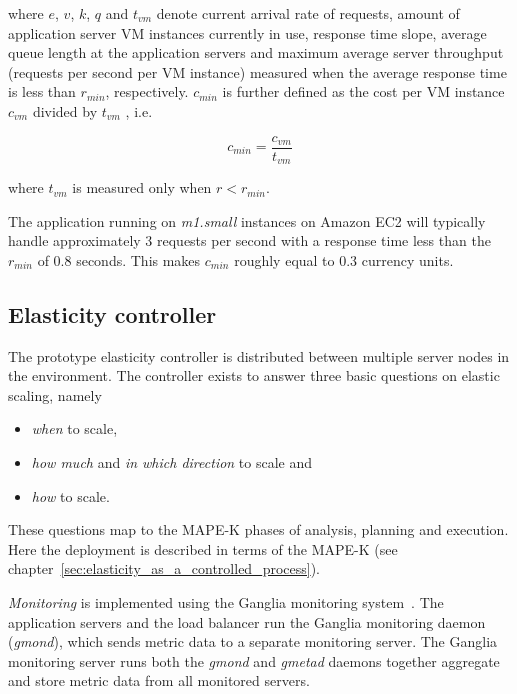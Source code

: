 \documentclass[english]{tktltiki2}
\theoremstyle{definition}
\theoremstyle{remark}
\begin{document}
where $e$, $v$, $k$, $q$ and $t_{vm}$ denote current arrival rate of requests,
amount of application server VM instances currently in use, response time slope,
average queue length at the application servers and maximum average
server throughput (requests per second per VM instance) measured when the average
response time is less than $r_{min}$, respectively. $c_{min}$ is further defined
as the cost per VM instance $c_{vm}$ divided by $t_{vm}$ , i.e.

\begin{equation}
	c_{min} = 
	\frac{c_{vm}}{t_{vm}} 
	\label{eq:costMin}
\end{equation}

where $t_{vm}$ is measured only when $r < r_{min}$. 

The application running on \textit{m1.small} instances on Amazon EC2 will
typically handle approximately 3 requests per second with a response time less
than the $r_{min}$ of 0.8 seconds. This makes $c_{min}$
roughly equal to 0.3 currency units.

\subsection{Elasticity controller}

The prototype elasticity controller is distributed between multiple server nodes
in the environment. The controller exists to answer three basic questions on
elastic scaling, namely 
\begin{itemize}
	\item{\textit{when} to scale,}
	\item{\textit{how much} and \textit{in which direction} to scale and}
  	\item{\textit{how} to scale}.
\end{itemize}

These questions map to the MAPE-K phases of analysis, planning and execution.
Here the deployment is described in terms of the MAPE-K (see
chapter~\ref{sec:elasticity_as_a_controlled_process}).

\textit{Monitoring} is implemented using the Ganglia monitoring
system~\cite{gangliapaper}. The application servers and the load balancer run the
Ganglia monitoring daemon (\textit{gmond}), which sends metric data to a
separate monitoring server. The Ganglia monitoring server runs both the
\textit{gmond} and \textit{gmetad} daemons together aggregate and store metric
data from all monitored servers. 
\end{document}
